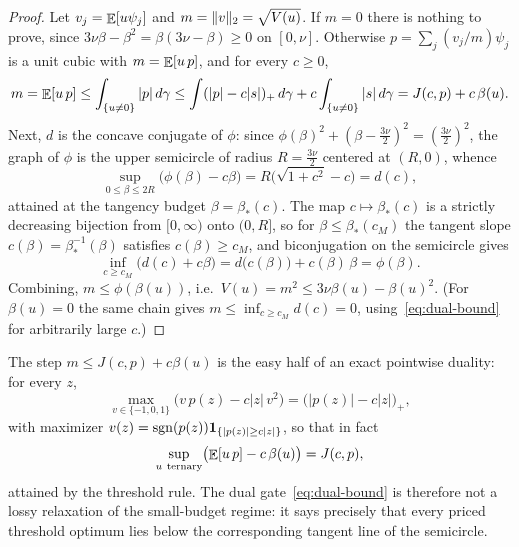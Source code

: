 \begin{proof}
Let $v_j=\mathop{\mathbb{E}}[u\psi_j]$ and $m=\lVert v\rVert_2=\sqrt{V(u)}$. If $m=0$ there is nothing to prove, since $3\nu\beta-\beta^2=\beta(3\nu-\beta)\ge0$ on $[0,\nu]$. Otherwise $p=\sum_j(v_j/m)\psi_j$ is a unit cubic with $m=\mathop{\mathbb{E}}[u\,p]$, and for every $c\ge0$,
\[
        m=\mathop{\mathbb{E}}[u\,p]\le\int_{\{u\neq0\}}|p|\,d\gamma
        \le\int(|p|-c|s|)_+\,d\gamma+c\int_{\{u\neq0\}}|s|\,d\gamma
        =J(c,p)+c\,\beta(u).
\]
Next, $d$ is the concave conjugate of $\phi$: since $\phi(\beta)^2+(\beta-\tfrac{3\nu}{2})^2=(\tfrac{3\nu}{2})^2$, the graph of $\phi$ is the upper semicircle of radius $R=\tfrac{3\nu}{2}$ centered at $(R,0)$, whence
\[
        \sup_{0\le\beta\le2R}\bigl(\phi(\beta)-c\beta\bigr)=R\bigl(\sqrt{1+c^2}-c\bigr)=d(c),
\]
attained at the tangency budget $\beta=\beta_*(c)$. The map $c\mapsto\beta_*(c)$ is a strictly decreasing bijection from $[0,\infty)$ onto $(0,R]$, so for $\beta\le\beta_*(c_M)$ the tangent slope $c(\beta)=\beta_*^{-1}(\beta)$ satisfies $c(\beta)\ge c_M$, and biconjugation on the semicircle gives
\[
        \inf_{c\ge c_M}\bigl(d(c)+c\beta\bigr)=d\bigl(c(\beta)\bigr)+c(\beta)\,\beta=\phi(\beta).
\]
Combining, $m\le\phi(\beta(u))$, i.e.\ $V(u)=m^2\le3\nu\beta(u)-\beta(u)^2$. (For $\beta(u)=0$ the same chain gives $m\le\inf_{c\ge c_M}d(c)=0$, using~\eqref{eq:dual-bound} for arbitrarily large $c$.)
\end{proof}

\begin{remark}\label{rem:exactness}
The step $m\le J(c,p)+c\beta(u)$ is the easy half of an exact pointwise duality: for every $z$,
\[
        \max_{v\in\{-1,0,1\}}\bigl(v\,p(z)-c|z|\,v^2\bigr)=\bigl(|p(z)|-c|z|\bigr)_+,
\]
with maximizer $v(z)=\operatorname{sgn}(p(z))\mathbf 1_{\{|p(z)|\ge c|z|\}}$, so that in fact
\[
        \sup_{u\ \text{ternary}}\bigl(\E[u\,p]-c\,\beta(u)\bigr)=J(c,p),
\]
attained by the threshold rule. The dual gate~\eqref{eq:dual-bound} is therefore not a lossy relaxation of the small-budget regime: it says precisely that every priced threshold optimum lies below the corresponding tangent line of the semicircle.
\end{remark}


